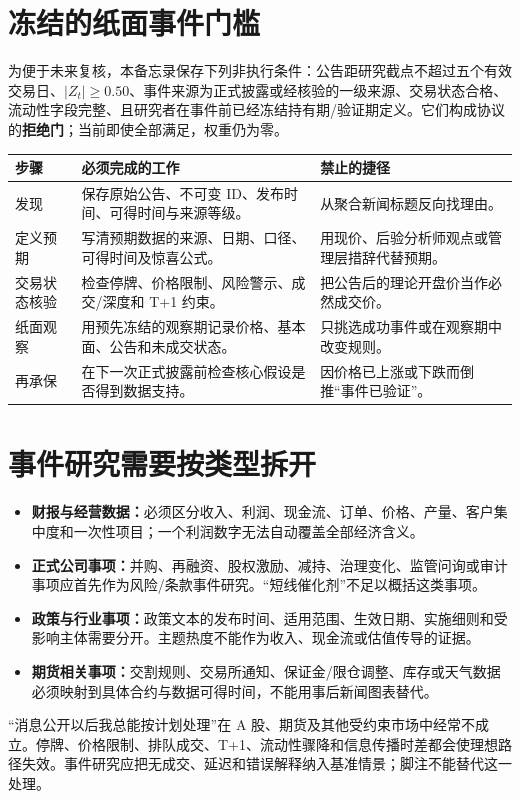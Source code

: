 \section{冻结的纸面事件门槛}

为便于未来复核，本备忘录保存下列非执行条件：公告距研究截点不超过五个有效交易日、\(\vert Z_t\vert \geq 0.50\)、事件来源为正式披露或经核验的一级来源、交易状态合格、流动性字段完整、且研究者在事件前已经冻结持有期/验证期定义。它们构成协议的\textbf{拒绝门}；当前即使全部满足，权重仍为零。

\begin{dashboardbox}[事件从发现到归档的纸面流程]
\begin{tabularx}{\textwidth}{L{2.55cm}X L{3.6cm}}
\toprule
\textbf{步骤} & \textbf{必须完成的工作} & \textbf{禁止的捷径} \\
\midrule
发现 & 保存原始公告、不可变 ID、发布时间、可得时间与来源等级。 & 从聚合新闻标题反向找理由。 \\
定义预期 & 写清预期数据的来源、日期、口径、可得时间及惊喜公式。 & 用现价、后验分析师观点或管理层措辞代替预期。 \\
交易状态核验 & 检查停牌、价格限制、风险警示、成交/深度和 T+1 约束。 & 把公告后的理论开盘价当作必然成交价。 \\
纸面观察 & 用预先冻结的观察期记录价格、基本面、公告和未成交状态。 & 只挑选成功事件或在观察期中改变规则。 \\
再承保 & 在下一次正式披露前检查核心假设是否得到数据支持。 & 因价格已上涨或下跌而倒推“事件已验证”。 \\
\bottomrule
\end{tabularx}
\end{dashboardbox}

\section{事件研究需要按类型拆开}

\begin{itemize}
  \item \textbf{财报与经营数据：}必须区分收入、利润、现金流、订单、价格、产量、客户集中度和一次性项目；一个利润数字无法自动覆盖全部经济含义。
  \item \textbf{正式公司事项：}并购、再融资、股权激励、减持、治理变化、监管问询或审计事项应首先作为风险/条款事件研究。“短线催化剂”不足以概括这类事项。
  \item \textbf{政策与行业事项：}政策文本的发布时间、适用范围、生效日期、实施细则和受影响主体需要分开。主题热度不能作为收入、现金流或估值传导的证据。
  \item \textbf{期货相关事项：}交割规则、交易所通知、保证金/限仓调整、库存或天气数据必须映射到具体合约与数据可得时间，不能用事后新闻图表替代。
\end{itemize}

\begin{riskbox}[事件策略最危险的假设]
“消息公开以后我总能按计划处理”在 A 股、期货及其他受约束市场中经常不成立。停牌、价格限制、排队成交、T+1、流动性骤降和信息传播时差都会使理想路径失效。事件研究应把无成交、延迟和错误解释纳入基准情景；脚注不能替代这一处理。
\end{riskbox}
